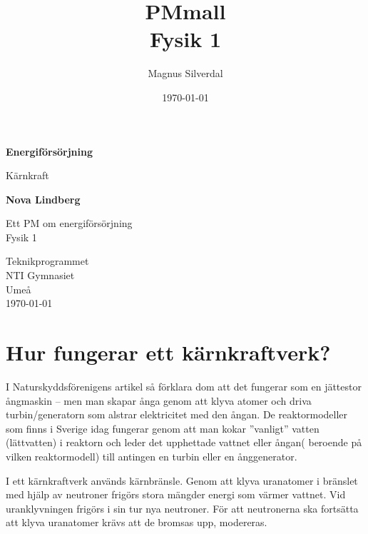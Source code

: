 \documentclass[11p]{article}
\title{PMmall \\ \small Fysik 1}
\author{Magnus Silverdal }
\date{\today}
\begin{document}
    \begin{titlepage}
        \begin{center}
            \vspace*{1cm}

            \Huge
            \textbf{Energiförsörjning}

            \vspace{0.5cm}
            \LARGE
            Kärnkraft
            \vspace{1.5cm}

            \textbf{Nova Lindberg}

            \vfill

            Ett PM om energiförsörjning \\
            Fysik 1

            \vspace{0.8cm}


            \Large
            Teknikprogrammet\\
            NTI Gymnasiet\\
            Umeå\\
            \today

        \end{center}
    \end{titlepage}
    \tableofcontents
    \newpage
    \section{Hur fungerar ett kärnkraftverk?}
    I Naturskyddsförenigens artikel \parencite{naturskyddsföreningen} så förklara dom att det fungerar som en jättestor ångmaskin – men man skapar ånga genom att klyva atomer och driva turbin/generatorn som alstrar elektricitet med den ångan. De reaktormodeller som finns i Sverige idag fungerar genom att man kokar ”vanligt” vatten (lättvatten) i reaktorn och leder det upphettade vattnet eller ångan( beroende på vilken reaktormodell) till antingen en turbin eller en ånggenerator.

    I ett kärnkraftverk används kärnbränsle. Genom att klyva uranatomer i bränslet med hjälp av neutroner frigörs stora mängder energi som värmer vattnet. Vid uranklyvningen frigörs i sin tur nya neutroner. För att neutronerna ska fortsätta att klyva uranatomer krävs att de bromsas upp, modereras.
\end{document}
